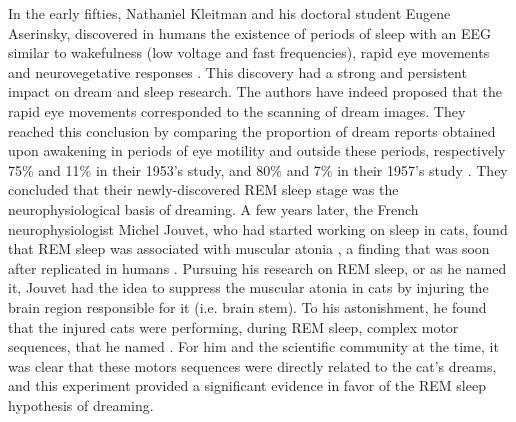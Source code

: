 In the early fifties, Nathaniel Kleitman and his doctoral student Eugene Aserinsky, discovered in humans the existence of periods of sleep with an EEG similar to wakefulness (low voltage and fast frequencies), rapid eye movements and neurovegetative responses \citep{aserinsky_regularly_1953}. This discovery had a strong and persistent impact on dream and sleep research. The authors have indeed proposed that the rapid eye movements corresponded to the scanning of dream images. They reached this conclusion by comparing the proportion of dream reports obtained upon awakening in periods of eye motility and outside these periods, respectively 75\% and 11\% in their 1953’s study, and 80\% and 7\% in their 1957's study \citep{dement_relation_1957}. They concluded that their newly-discovered REM sleep stage was the neurophysiological basis of dreaming. A few years later, the French neurophysiologist Michel Jouvet, who had started working on sleep in cats, found that REM sleep was associated with muscular atonia \citep{jouvet_sur_1959}, a finding that was soon after replicated in humans \citep{berger_tonus_1961}. Pursuing his research on REM sleep, or  as he named it, Jouvet had the idea to suppress the muscular atonia in cats by injuring the brain region responsible for it (i.e. brain stem). To his astonishment, he found that the injured cats were performing, during REM sleep, complex motor sequences, that he named  \citep{sastre_comportement_1979}. For him and the scientific community at the time, it was clear that these motors sequences were directly related to the cat's dreams, and this experiment provided a significant evidence in favor of the REM sleep hypothesis of dreaming.

